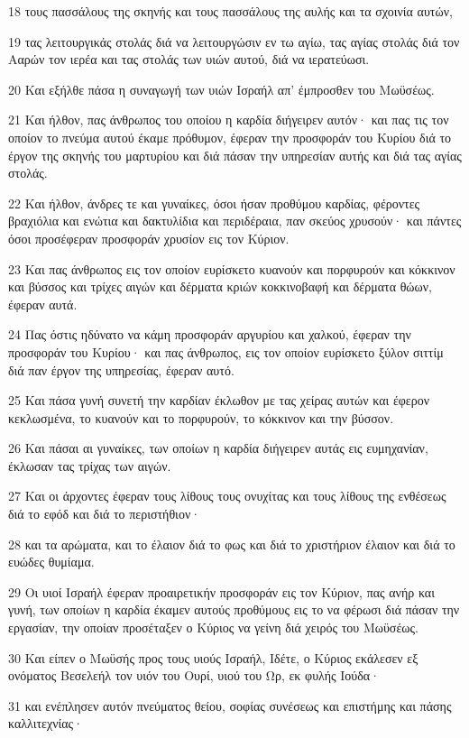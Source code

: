 \par 18 τους πασσάλους της σκηνής και τους πασσάλους της αυλής και τα σχοινία αυτών,
\par 19 τας λειτουργικάς στολάς διά να λειτουργώσιν εν τω αγίω, τας αγίας στολάς διά τον Ααρών τον ιερέα και τας στολάς των υιών αυτού, διά να ιερατεύωσι.
\par 20 Και εξήλθε πάσα η συναγωγή των υιών Ισραήλ απ' έμπροσθεν του Μωϋσέως.
\par 21 Και ήλθον, πας άνθρωπος του οποίου η καρδία διήγειρεν αυτόν· και πας τις τον οποίον το πνεύμα αυτού έκαμε πρόθυμον, έφεραν την προσφοράν του Κυρίου διά το έργον της σκηνής του μαρτυρίου και διά πάσαν την υπηρεσίαν αυτής και διά τας αγίας στολάς.
\par 22 Και ήλθον, άνδρες τε και γυναίκες, όσοι ήσαν προθύμου καρδίας, φέροντες βραχιόλια και ενώτια και δακτυλίδια και περιδέραια, παν σκεύος χρυσούν· και πάντες όσοι προσέφεραν προσφοράν χρυσίον εις τον Κύριον.
\par 23 Και πας άνθρωπος εις τον οποίον ευρίσκετο κυανούν και πορφυρούν και κόκκινον και βύσσος και τρίχες αιγών και δέρματα κριών κοκκινοβαφή και δέρματα θώων, έφεραν αυτά.
\par 24 Πας όστις ηδύνατο να κάμη προσφοράν αργυρίου και χαλκού, έφεραν την προσφοράν του Κυρίου· και πας άνθρωπος, εις τον οποίον ευρίσκετο ξύλον σιττίμ διά παν έργον της υπηρεσίας, έφεραν αυτό.
\par 25 Και πάσα γυνή συνετή την καρδίαν έκλωθον με τας χείρας αυτών και έφερον κεκλωσμένα, το κυανούν και το πορφυρούν, το κόκκινον και την βύσσον.
\par 26 Και πάσαι αι γυναίκες, των οποίων η καρδία διήγειρεν αυτάς εις ευμηχανίαν, έκλωσαν τας τρίχας των αιγών.
\par 27 Και οι άρχοντες έφεραν τους λίθους τους ονυχίτας και τους λίθους της ενθέσεως διά το εφόδ και διά το περιστήθιον·
\par 28 και τα αρώματα, και το έλαιον διά το φως και διά το χριστήριον έλαιον και διά το ευώδες θυμίαμα.
\par 29 Οι υιοί Ισραήλ έφεραν προαιρετικήν προσφοράν εις τον Κύριον, πας ανήρ και γυνή, των οποίων η καρδία έκαμεν αυτούς προθύμους εις το να φέρωσι διά πάσαν την εργασίαν, την οποίαν προσέταξεν ο Κύριος να γείνη διά χειρός του Μωϋσέως.
\par 30 Και είπεν ο Μωϋσής προς τους υιούς Ισραήλ, Ιδέτε, ο Κύριος εκάλεσεν εξ ονόματος Βεσελεήλ τον υιόν του Ουρί, υιού του Ωρ, εκ φυλής Ιούδα·
\par 31 και ενέπλησεν αυτόν πνεύματος θείου, σοφίας συνέσεως και επιστήμης και πάσης καλλιτεχνίας·
